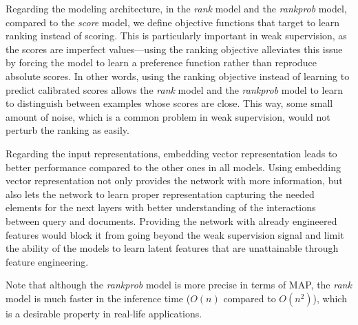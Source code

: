 \documentclass[sigconf]{acmart}
\newcommand{\modelone}{\textit{score} model\xspace}
\newcommand{\modeltwo}{\textit{rank} model\xspace}
\newcommand{\modelthree}{\textit{rank\-prob} model\xspace}
\newcommand{\feedthree}{embedding vector representation\xspace}
\def\:{\hskip0pt} \newcommand{\mypar}[1]{\vspace*{-0.1ex}\medskip\noindent\textbf{#1}~}
\begin{document}
Regarding the modeling architecture, in the \modeltwo and the \modelthree, compared to the \modelone, we define objective functions that target to learn ranking instead of scoring. This is particularly important in weak supervision, as the scores are imperfect values\:---\:using the ranking objective alleviates this issue by forcing the model to learn a preference function rather than reproduce absolute scores.
In other words, using the ranking objective instead of learning to predict calibrated scores allows the \modeltwo and the \modelthree to learn to distinguish between examples whose scores are close. This way, some small amount of noise, which is a common problem in weak supervision, would not perturb the ranking as easily.

Regarding the input representations, \feedthree leads to better performance compared to the other ones in all models.
Using \feedthree not only provides the network with more information, but also lets the network to learn proper representation capturing the needed elements for the next layers with better understanding of the interactions between query and documents. 
Providing the network with already engineered features would block it from going beyond the weak supervision signal and limit the ability of the models to learn latent features that are unattainable through feature engineering. 

Note that although the \modelthree is more precise in terms of MAP, the \modeltwo is much faster in the inference time ($O(n)$ compared to $O(n^2)$), which is a desirable property in real-life applications.
\end{document}

